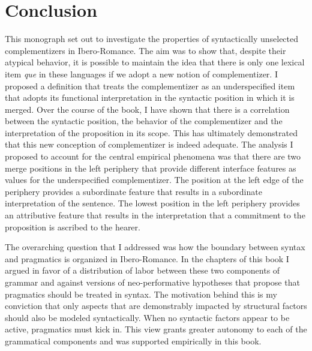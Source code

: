 \chapter{Conclusion}\label{sec:conclusion}

This monograph set out to investigate the properties of syntactically unselected complementizers in  Ibero-Romance. The aim was to show that, despite their atypical behavior, it is possible to maintain the idea that there is only one lexical  item \emph{que} in these languages if we adopt a new notion of complementizer. I proposed a definition that treats the complementizer as an underspecified item that adopts its functional interpretation in the syntactic position in which it is merged.
Over the course of the book,  I have shown that there is a correlation between the syntactic position, the behavior of the complementizer and the interpretation of the proposition in its scope. This has ultimately demonstrated that this new conception of complementizer is indeed adequate. The analysis I proposed to account for the central empirical phenomena  was that there are two merge positions in the left periphery that provide different interface features as values for the underspecified complementizer. The position at the left edge of the periphery provides a subordinate feature that results in a subordinate interpretation of the sentence. The lowest position in the left periphery provides an attributive feature that results in the interpretation that  a commitment to the proposition is ascribed to the hearer.

The overarching question that I addressed  was how the boundary between syntax and pragmatics is organized in Ibero-Romance. In the chapters of this book I argued in favor of a distribution of labor between these two components of grammar and against versions of neo-performative hypotheses that propose that  pragmatics should be treated in syntax. The motivation behind this is my conviction that only aspects that are demonstrably impacted by structural factors should also be modeled syntactically.
When no syntactic factors appear to be active,  pragmatics must kick in.  This view grants greater autonomy  to each of the grammatical components and was   supported empirically in this book. 

